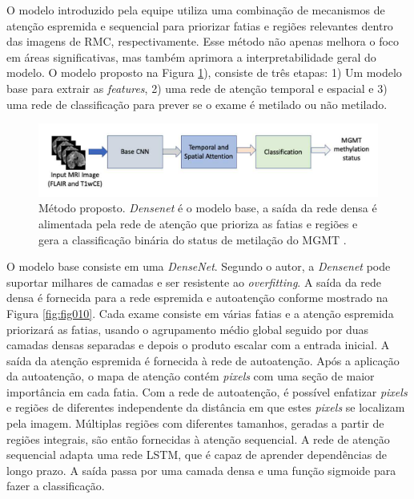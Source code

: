 O modelo introduzido pela equipe utiliza uma combinação de mecanismos de atenção espremida e sequencial para priorizar fatias e regiões relevantes dentro das imagens de \gls{RMC}, respectivamente. Esse método não apenas melhora o foco em áreas significativas, mas também aprimora a interpretabilidade geral do modelo. O modelo proposto na Figura \ref{fig:fig009}), consiste de três etapas: 1) Um modelo base para extrair as \textit{features}, 2) uma rede de atenção temporal e espacial e 3) uma rede de classificação para prever se o exame é metilado ou não metilado. 

\begin{figure}[htbp]
    \centering
    \includegraphics[width=1\textwidth]{figures/fig009.png}
    \caption{Método proposto. \textit{Densenet} é o modelo base, a saída da rede densa é alimentada pela rede de atenção que prioriza as fatias e regiões e gera a classificação binária do status de metilação do MGMT \cite{iranmehrImprovedPredictionMGMT2022}.
    }
    \label{fig:fig009}
\end{figure}

O modelo base consiste em uma \textit{DenseNet}. Segundo o autor, a \textit{Densenet} pode suportar milhares de camadas e ser resistente ao \textit{overfitting}. A saída da rede densa é fornecida para a rede espremida e autoatenção conforme mostrado na Figura \ref{fig:fig010}. Cada exame consiste em várias fatias e a atenção espremida priorizará as fatias, usando o agrupamento médio global seguido por duas camadas densas separadas e depois o produto escalar com a entrada inicial. A saída da atenção espremida é fornecida à rede de autoatenção. Após a aplicação da autoatenção, o mapa de atenção contém \textit{pixels} com uma seção de maior importância em cada fatia. Com a rede de autoatenção, é possível enfatizar \textit{pixels} e regiões de diferentes independente da distância em que estes \textit{pixels} se localizam pela imagem. Múltiplas regiões com diferentes tamanhos, geradas a partir de regiões integrais, são então fornecidas à atenção sequencial. A rede de atenção sequencial adapta uma rede \gls{LSTM}, que é capaz de aprender dependências de longo prazo. A saída passa por uma camada densa e uma função sigmoide para fazer a classificação.

